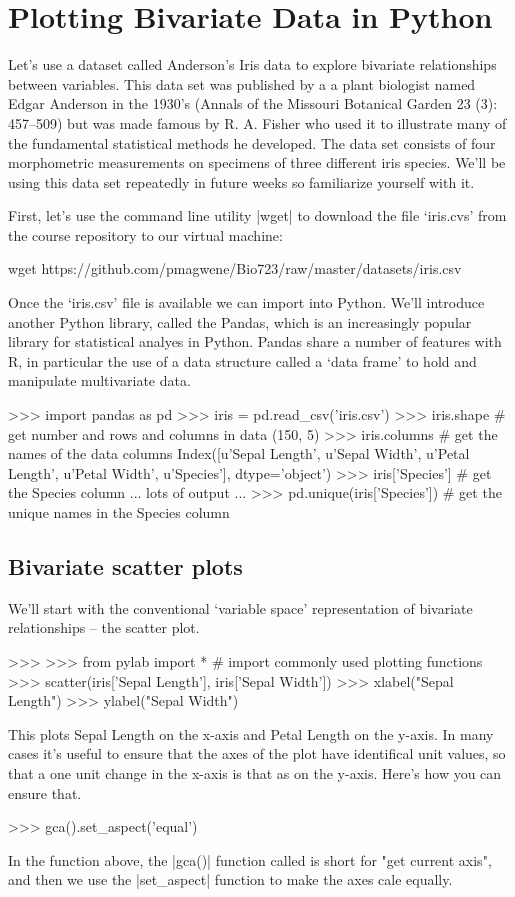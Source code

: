 \section{Plotting Bivariate Data in Python}


Let's use a dataset called Anderson's Iris data to explore bivariate relationships between variables. This data set was published by a a plant biologist named Edgar Anderson in the 1930's (Annals of the Missouri Botanical Garden 23 (3): 457–509) but was made famous by R. A. Fisher who used it to illustrate many of the fundamental statistical methods he developed. The data set consists of four morphometric measurements on specimens of three different iris species.  We'll be using this data set repeatedly in future weeks so familiarize yourself with it.

First, let's use the command line utility |wget| to download the file `iris.cvs' from the course repository to our virtual machine:
\begin{bash}
wget https://github.com/pmagwene/Bio723/raw/master/datasets/iris.csv
\end{bash}

Once the `iris.csv' file is available we can import into Python.  We'll introduce another Python library, called the Pandas, which is an increasingly popular library for statistical analyes in Python.  Pandas share a number of features with R, in particular the use of a data structure called a `data frame' to hold and manipulate multivariate data.
%
\begin{python}
>>> import pandas as pd
>>> iris = pd.read_csv('iris.csv')
>>> iris.shape  # get number and rows and columns in data
(150, 5)
>>> iris.columns  # get the names of the data columns
Index([u'Sepal Length', u'Sepal Width', u'Petal Length', u'Petal Width', u'Species'], dtype='object')
>>> iris['Species']  # get the Species column
... lots of output ...
>>> pd.unique(iris['Species'])  # get the unique names in the Species column
\end{python}


\subsection{Bivariate scatter plots}
We'll start with the conventional `variable space' representation of bivariate relationships -- the scatter plot.  
%
\begin{python}
>>> %
>>> from pylab import *  # import commonly used plotting functions
>>> scatter(iris['Sepal Length'], iris['Sepal Width'])
>>> xlabel("Sepal Length")
>>> ylabel("Sepal Width")
\end{python}
%
This plots Sepal Length on the x-axis and Petal Length on the y-axis. In many cases it's useful to ensure that the axes of the plot have identifical unit values, so that a one unit change in the x-axis is that as on the y-axis.  Here's how you can ensure that.
%
\begin{python}
>>> gca().set_aspect('equal')
\end{python}
%
In the function above, the |gca()| function called is short for "get current axis", and then we use the |set_aspect| function to make the axes cale equally.


